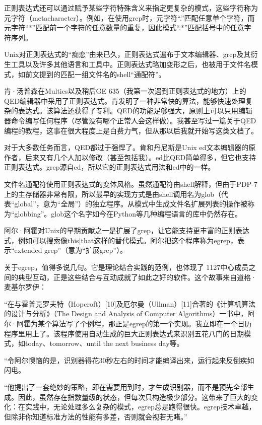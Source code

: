 \documentclass[a4paper,12pt,UTF8,twoside]{ctexbook}
\begin{document}
{正则表达式还可以通过赋予某些字符特殊含义来指定更复杂的模式，这些字符称为元字符（metacharacter）。例如，在使用grep时，元字符“.”匹配任意单个字符，而元字符“*”匹配前一个字符的任意数量的重复，因此模式“.*”匹配括号中的任意字符序列。

Unix对正则表达式的“痴恋”由来已久，正则表达式遍布于文本编辑器、grep及其衍生工具以及许多其他语言和工具中。正则表达式略加变形之后，也被用于文件名模式，如前文提到的匹配一组文件名的shell“通配符”。

肯·汤普森在Multics以及稍后GE 635（我第一次遇到正则表达式的地方）上的QED编辑器中采用了正则表达式。肯发明了一种非常快的算法，能够快速处理复杂的表达式。该算法还获得了专利。QED的功能足够强大，原则上可以只用编辑器命令编写任何程序（尽管没有哪个正常人会这样做）。我甚至写过一篇关于QED编程的教程，这事在很大程度上是白费力气，但从那以后我就开始写这类文档了。

对于大多数任务而言，QED都过于强悍了。肯和丹尼斯是Unix ed文本编辑器的原作者，后来又有几个人加以修改（甚至包括我）。ed比QED简单得多，但它也支持正则表达式。grep源自ed，所以它的正则表达式用法和ed中的一样。

文件名通配符使用正则表达式的变体风格。虽然通配符由shell解释，但由于PDP-7上的主存储器非常有限，所以最早的实现方式是由shell调用名为glob（代表“global”，意为“全局”）的独立程序。从模式中生成文件名扩展列表的操作被称为“globbing”。glob这个名字如今在Python等几种编程语言的库中仍然存在。

阿尔·阿霍对Unix的早期贡献之一是扩展了grep，让它能支持更丰富的正则表达式，例如可以搜索像this|that这样的替代模式。阿尔把这个程序称为egrep，表示“extended grep”（意为“扩展grep”）。

关于egrep，值得多说几句。它是理论结合实践的范例，也体现了 1127中心成员之间的典型互动，正是这些结合与互动成就了如此之好的软件。这个故事来自道格·麦基尔罗伊：

“在与霍普克罗夫特（Hopcroft）[10]及厄尔曼（Ullman）[11]合著的《计算机算法的设计与分析》（The Design and Analysis of Computer Algorithms）一书中，阿尔·阿霍为某个算法写了个例程，那正是egrep的第一个实现。我立即在一个日历程序里用上了。该程序使用自动生成的巨大正则表达式来识别五花八门的日期模式，如today、tomorrow、until the next business day等。

“令阿尔懊恼的是，识别器得花30秒左右的时间才能编译出来，运行起来反倒疾如闪电。

“他提出了一套绝妙的策略，即在需要用到时，才生成识别器，而不是预先全部生成。因此，虽然存在指数量级的状态，但每次只构造极少部分。这带来了巨大的变化：在实践中，无论处理多么复杂的模式，egrep总是跑得很快。egrep技术卓越，但除非你知道标准方法的性能有多差，否则就会视若无睹。”



}
\end{document}
